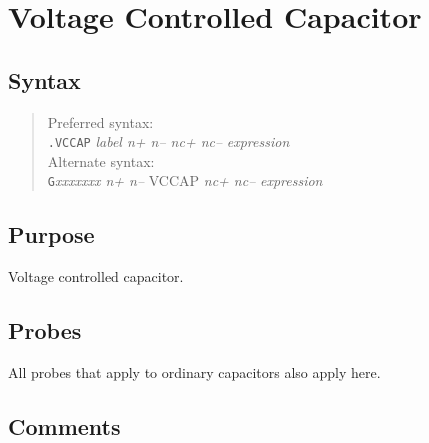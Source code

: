 %
%
%
%
\section{Voltage Controlled Capacitor}
\subsection{Syntax}
\begin{verse}
Preferred syntax:\\
{\tt .VCCAP} {\it label n+ n-- nc+ nc--} {\it expression}\\
Alternate syntax:\\
{\tt G}{\it xxxxxxx n+ n--} VCCAP {\it nc+ nc--} {\it expression}
\end{verse}
\subsection{Purpose}

Voltage controlled capacitor.
\subsection{Probes}

All probes that apply to ordinary capacitors also apply here.
\subsection{Comments}

